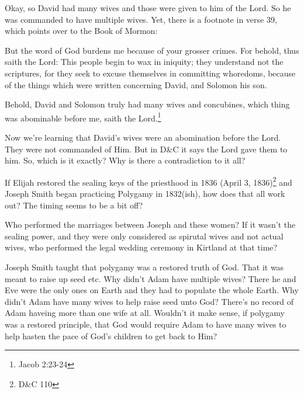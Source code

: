 Okay, so David had many wives and those were given to him of the Lord. So he was
commanded to have multiple wives. Yet, there is a footnote in verse 39, which points
over to the Book of Mormon:

\begin{displayquote}
But the word of God burdens me because of your grosser crimes. For behold, 
thus saith the Lord: This people begin to wax in iniquity; they understand not the 
scriptures, for they seek to excuse themselves in committing whoredoms, because of 
the things which were written concerning David, and Solomon his son.

Behold, David and Solomon truly had many wives and concubines, which thing was 
abominable before me, saith the Lord.\footnote{Jacob 2:23-24}
\end{displayquote}

Now we're learning that David's wives were an abomination before the Lord. They were
not commanded of Him. But in D\&C it says the Lord gave them to him. So, which is it
exactly? Why is there a contradiction to it all?

If Elijah restored the sealing keys of the priesthood in 1836 (April 3,
  1836)\footnote{D\&C 110} and Joseph Smith began practicing Polygamy in 1832(ish),
  how does that all work out? The timing seems to be a bit off?

Who performed the marriages between Joseph and these women? If it wasn't the sealing
power, and they were only considered as spirutal wives and not actual wives, who
performed the legal wedding ceremony in Kirtland at that time?

Joseph Smith taught that polygamy was a restored truth of God. That it was meant to
raise up seed etc. Why didn't Adam have multiple wives? There he and Eve were the
only ones on Earth and they had to populate the whole Earth. Why didn't Adam have
many wives to help raise seed unto God? There's no record of Adam haveing more than
one wife at all. Wouldn't it make sense, if polygamy was a restored principle, that
God would require Adam to have many wives to help hasten the pace of God's children
to get back to Him?